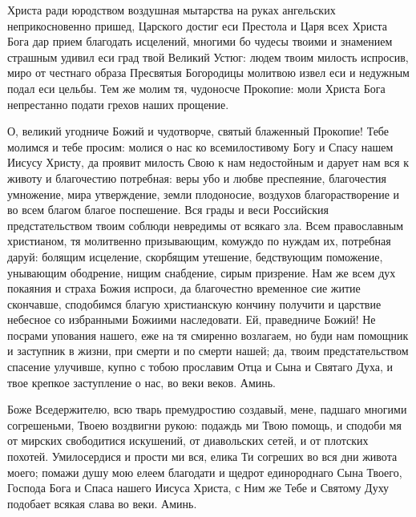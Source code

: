 Христа ради юродством воздушная мытарства на руках ангельских неприкосновенно пришед, Царского достиг еси Престола и Царя всех Христа Бога дар прием благодать исцелений, многими бо чудесы твоими и знамением страшным удивил еси град твой Великий Устюг: людем твоим милость испросив, миро от честнаго образа Пресвятыя Богородицы молитвою извел еси и недужным подал еси цельбы. Тем же молим тя, чудоносче Прокопие: моли Христа Бога непрестанно подати грехов наших прощение.




О, великий угодниче Божий и чудотворче, святый блаженный Прокопие! Тебе молимся и тебе просим: молися о нас ко всемилостивому Богу и Спасу нашем Иисусу Христу, да проявит милость Свою к нам недостойным и дарует нам вся к животу и благочестию потребная: веры убо и любве преспеяние, благочестия умножение, мира утверждение, земли плодоносие, воздухов благорастворение и во всем благом благое поспешение. Вся грады и веси Российския предстательством твоим соблюди невредимы от всякаго зла. Всем православным христианом, тя молитвенно призывающим, комуждо по нуждам их, потребная даруй: болящим исцеление, скорбящим утешение, бедствующим поможение, унывающим ободрение, нищим снабдение, сирым призрение.  Нам же всем дух покаяния и страха Божия испроси, да благочестно временное сие житие скончавше, сподобимся благую христианскую кончину получити и царствие небесное со избранными Божиими наследовати. Ей, праведниче Божий! Не посрами упования нашего, еже на тя смиренно возлагаем, но буди нам помощник и заступник в жизни, при смерти и по смерти нашей; да, твоим предстательством спасение улучивше, купно с тобою прославим Отца и Сына и Святаго Духа, и твое крепкое заступление о нас, во веки веков. Аминь.
\mychapterending

 


Боже Вседержителю, всю тварь премудростию создавый, мене, падшаго многими согрешеньми, Твоею воздвигни рукою: подаждь ми Твою помощь, и сподоби мя от мирских свободитися искушений, от диавольских сетей, и от плотских похотей. Умилосердися и прости ми вся, елика Ти согреших во вся дни живота моего; помажи душу мою елеем благодати и щедрот единороднаго Сына Твоего, Господа Бога и Спаса нашего Иисуса Христа, с Ним же Тебе и Святому Духу подобает всякая слава во веки. Аминь.
\mychapterending


 


